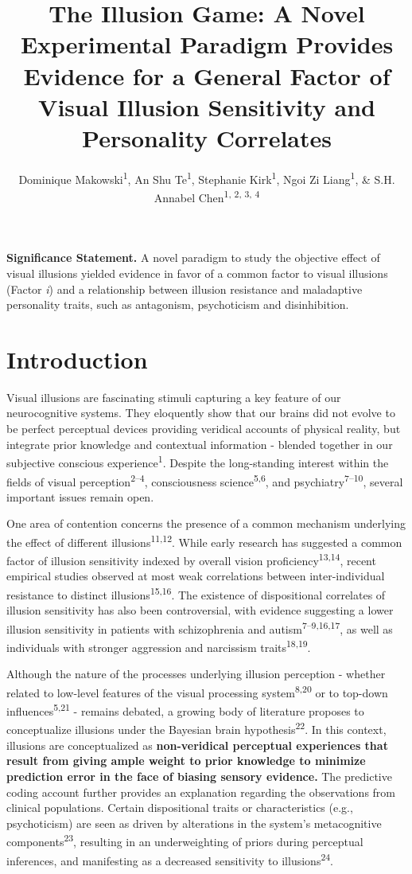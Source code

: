 \documentclass[
  man,floatsintext]{apa6}
\title{\textbf{The Illusion Game: A Novel Experimental Paradigm Provides Evidence for a General Factor of Visual Illusion Sensitivity and Personality Correlates}}
\author{Dominique Makowski\textsuperscript{1}, An Shu Te\textsuperscript{1}, Stephanie Kirk\textsuperscript{1}, Ngoi Zi Liang\textsuperscript{1}, \& S.H. Annabel Chen\textsuperscript{1, 2, 3, 4}}
\date{}
\affiliation{\vspace{0.5cm}\textsuperscript{1} School of Social Sciences, Nanyang Technological University, Singapore\\\textsuperscript{2} LKC Medicine, Nanyang Technological University, Singapore\\\textsuperscript{3} National Institute of Education, Singapore\\\textsuperscript{4} Centre for Research and Development in Learning, Nanyang Technological University, Singapore}
\begin{document}
\maketitle

\textbf{Significance Statement.} A novel paradigm to study the objective effect of visual illusions yielded evidence in favor of a common factor to visual illusions (Factor \emph{i}) and a relationship between illusion resistance and maladaptive personality traits, such as antagonism, psychoticism and disinhibition.

\hypertarget{introduction}{%
\section{Introduction}\label{introduction}}

Visual illusions are fascinating stimuli capturing a key feature of our neurocognitive systems. They eloquently show that our brains did not evolve to be perfect perceptual devices providing veridical accounts of physical reality, but integrate prior knowledge and contextual information - blended together in our subjective conscious experience\textsuperscript{1}. Despite the long-standing interest within the fields of visual perception\textsuperscript{2--4}, consciousness science\textsuperscript{5,6}, and psychiatry\textsuperscript{7--10}, several important issues remain open.

One area of contention concerns the presence of a common mechanism underlying the effect of different illusions\textsuperscript{11,12}. While early research has suggested a common factor of illusion sensitivity indexed by overall vision proficiency\textsuperscript{13,14}, recent empirical studies observed at most weak correlations between inter-individual resistance to distinct illusions\textsuperscript{15,16}. The existence of dispositional correlates of illusion sensitivity has also been controversial, with evidence suggesting a lower illusion sensitivity in patients with schizophrenia and autism\textsuperscript{7--9,16,17}, as well as individuals with stronger aggression and narcissism traits\textsuperscript{18,19}.

Although the nature of the processes underlying illusion perception - whether related to low-level features of the visual processing system\textsuperscript{8,20} or to top-down influences\textsuperscript{5,21} - remains debated, a growing body of literature proposes to conceptualize illusions under the Bayesian brain hypothesis\textsuperscript{22}. In this context, illusions are conceptualized as \textbf{non-veridical perceptual experiences that result from giving ample weight to prior knowledge to minimize prediction error in the face of biasing sensory evidence.} The predictive coding account further provides an explanation regarding the observations from clinical populations. Certain dispositional traits or characteristics (e.g., psychoticism) are seen as driven by alterations in the system's metacognitive components\textsuperscript{23}, resulting in an underweighting of priors during perceptual inferences, and manifesting as a decreased sensitivity to illusions\textsuperscript{24}.
\end{document}
